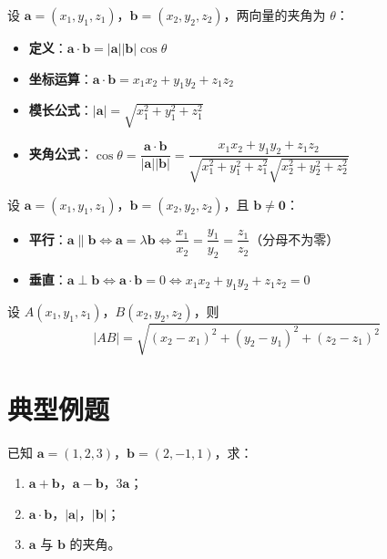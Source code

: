 \documentclass[11pt]{ctexrep}
\begin{document}
\begin{property}[空间向量的数量积]
    设 $\boldsymbol{a} = (x_1, y_1, z_1)$，$\boldsymbol{b} = (x_2, y_2, z_2)$，两向量的夹角为 $\theta$：
    \begin{itemize}
        \item \textbf{定义}：$\boldsymbol{a} \cdot \boldsymbol{b} = |\boldsymbol{a}||\boldsymbol{b}|\cos\theta$
        \item \textbf{坐标运算}：$\boldsymbol{a} \cdot \boldsymbol{b} = x_1x_2 + y_1y_2 + z_1z_2$
        \item \textbf{模长公式}：$|\boldsymbol{a}| = \sqrt{x_1^2 + y_1^2 + z_1^2}$
        \item \textbf{夹角公式}：$\cos\theta = \dfrac{\boldsymbol{a} \cdot \boldsymbol{b}}{|\boldsymbol{a}||\boldsymbol{b}|} = \dfrac{x_1x_2 + y_1y_2 + z_1z_2}{\sqrt{x_1^2+y_1^2+z_1^2}\sqrt{x_2^2+y_2^2+z_2^2}}$
    \end{itemize}
\end{property}

\begin{property}[空间向量的位置关系]
    设 $\boldsymbol{a} = (x_1, y_1, z_1)$，$\boldsymbol{b} = (x_2, y_2, z_2)$，且 $\boldsymbol{b} \neq \boldsymbol{0}$：
    \begin{itemize}
        \item \textbf{平行}：$\boldsymbol{a} \parallel \boldsymbol{b} \Leftrightarrow \boldsymbol{a} = \lambda\boldsymbol{b} \Leftrightarrow \dfrac{x_1}{x_2} = \dfrac{y_1}{y_2} = \dfrac{z_1}{z_2}$（分母不为零）
        \item \textbf{垂直}：$\boldsymbol{a} \perp \boldsymbol{b} \Leftrightarrow \boldsymbol{a} \cdot \boldsymbol{b} = 0 \Leftrightarrow x_1x_2 + y_1y_2 + z_1z_2 = 0$
    \end{itemize}
\end{property}

\begin{property}[空间两点间距离公式]
    设 $A(x_1, y_1, z_1)$，$B(x_2, y_2, z_2)$，则
    \[
    |AB| = \sqrt{(x_2-x_1)^2 + (y_2-y_1)^2 + (z_2-z_1)^2}
    \]
\end{property}

\section*{典型例题}

\begin{example}[向量的坐标运算]
    已知 $\boldsymbol{a} = (1, 2, 3)$，$\boldsymbol{b} = (2, -1, 1)$，求：
    \begin{enumerate}
        \item $\boldsymbol{a} + \boldsymbol{b}$，$\boldsymbol{a} - \boldsymbol{b}$，$3\boldsymbol{a}$；
        \item $\boldsymbol{a} \cdot \boldsymbol{b}$，$|\boldsymbol{a}|$，$|\boldsymbol{b}|$；
        \item $\boldsymbol{a}$ 与 $\boldsymbol{b}$ 的夹角。
    \end{enumerate}
\end{example}
\end{document}
